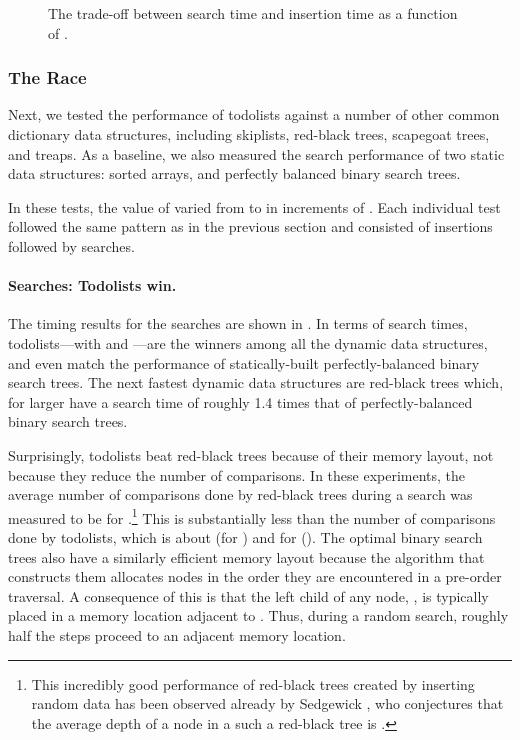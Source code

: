\documentclass{patmorin}
\begin{document}
\begin{figure}
{
 }
  \caption{The trade-off between search time and insertion time as a function of .}
\end{figure}

\subsubsection{The Race}

Next, we tested the performance of todolists against a number of other
common dictionary data structures, including skiplists, red-black trees,
scapegoat trees, and treaps. As a baseline, we also measured the search
performance of two static data structures: sorted arrays, and perfectly
balanced binary search trees.

In these tests, the value of  varied from  to 
in increments of .   Each individual test followed the same
pattern as in the previous section and consisted of  insertions
followed by  searches.

\paragraph{Searches: Todolists win.}
The timing results for the searches are shown in . In
terms of search times, todolists---with  and ---are
the winners among all the dynamic data structures, and even match the
performance of statically-built perfectly-balanced binary search trees.
The next fastest dynamic data structures are red-black trees which,
for larger  have a search time of roughly 1.4 times that of
perfectly-balanced binary search trees.

Surprisingly, todolists beat red-black trees because of their memory
layout, not because they reduce the number of comparisons. In
these experiments, the average number of comparisons done by
red-black trees during a search was measured to be 
for .\footnote{This incredibly good performance
of red-black trees created by inserting random data has been observed
already by Sedgewick \cite{sedgewick:left-leaning}, who conjectures
that the average depth of a node in a such a red-black tree is .} This is substantially less than the number of comparisons done
by todolists, which is about  (for ) and  for (). The optimal binary search trees also have a
similarly efficient memory layout because the algorithm that constructs
them allocates nodes in the order they are encountered in a pre-order
traversal. A consequence of this is that the left child of any node,
, is typically placed in a memory location adjacent to .  Thus,
during a random search, roughly half the steps proceed to an adjacent
memory location.
\end{document}
